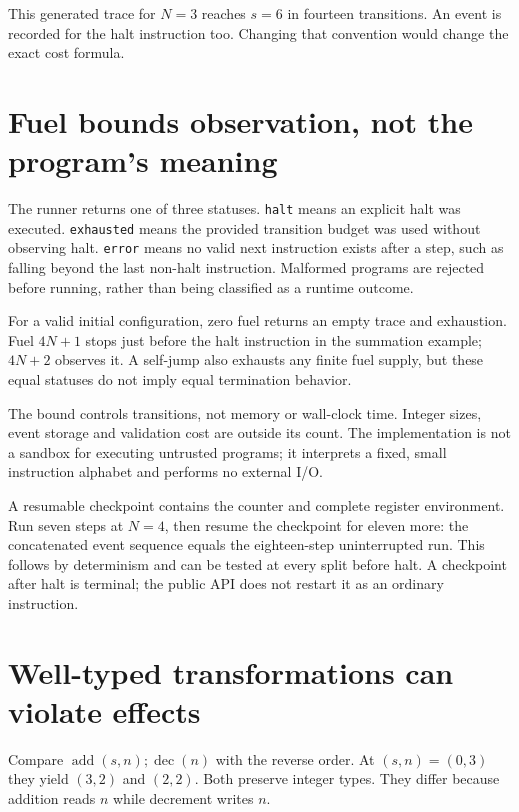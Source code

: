 \begin{center}\end{center}
This generated trace for $N=3$ reaches $s=6$ in fourteen transitions.
An event is recorded for the halt instruction too. Changing that convention
would change the exact cost formula.

\section{Fuel bounds observation, not the program's meaning}
The runner returns one of three statuses. \texttt{halt} means an explicit halt
was executed. \texttt{exhausted} means the provided transition budget was used
without observing halt. \texttt{error} means no valid next instruction exists
after a step, such as falling beyond the last non-halt instruction.
Malformed programs are rejected before running, rather than being classified
as a runtime outcome.


For a valid initial configuration, zero fuel returns an empty trace and
exhaustion. Fuel $4N+1$ stops just before the halt instruction in the summation
example; $4N+2$ observes it. A self-jump also exhausts any finite fuel supply,
but these equal statuses do not imply equal termination behavior.

The bound controls transitions, not memory or wall-clock time. Integer sizes,
event storage and validation cost are outside its count. The implementation
is not a sandbox for executing untrusted programs; it interprets a fixed,
small instruction alphabet and performs no external I/O.

A resumable checkpoint contains the counter and complete register environment.
Run seven steps at $N=4$, then resume the checkpoint for eleven more:
the concatenated event sequence equals the eighteen-step uninterrupted run.
This follows by determinism and can be tested at every split before halt.
A checkpoint after halt is terminal; the public API does not restart it as
an ordinary instruction.

\section{Well-typed transformations can violate effects}
Compare $\operatorname{add}(s,n);\operatorname{dec}(n)$ with the reverse order.
At $(s,n)=(0,3)$ they yield $(3,2)$ and $(2,2)$.
Both preserve integer types. They differ because addition reads $n$ while
decrement writes $n$.

